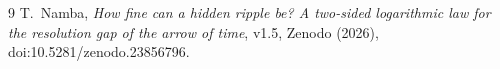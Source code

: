 \begin{thebibliography}{9}
 T.~Namba, \emph{How fine can a hidden ripple be? A two-sided logarithmic law for the resolution gap of the arrow of time}, v1.5, Zenodo (2026), doi:10.5281/zenodo.23856796.
\end{thebibliography}

